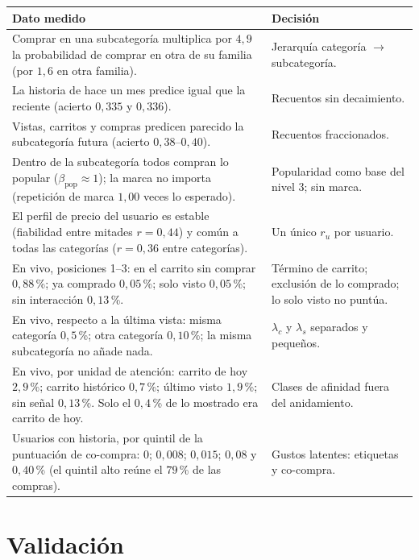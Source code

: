 \documentclass[11pt,a4paper]{article}
\begin{document}
\begin{center}
\begin{tabular}{p{7.4cm}p{7.4cm}}
\toprule
Dato medido & Decisión\\
\midrule
Comprar en una subcategoría multiplica por $4{,}9$ la probabilidad de comprar en otra de su familia
(por $1{,}6$ en otra familia). & Jerarquía categoría $\to$ subcategoría.\\
La historia de hace un mes predice igual que la reciente (acierto $0{,}335$ y $0{,}336$). & Recuentos sin
decaimiento.\\
Vistas, carritos y compras predicen parecido la subcategoría futura (acierto $0{,}38$--$0{,}40$). & Recuentos
fraccionados.\\
Dentro de la subcategoría todos compran lo popular ($\beta_{\text{pop}}\approx 1$); la marca no importa
(repetición de marca $1{,}00$ veces lo esperado). & Popularidad como base del nivel 3; sin marca.\\
El perfil de precio del usuario es estable (fiabilidad entre mitades $r=0{,}44$) y común a todas las
categorías ($r=0{,}36$ entre categorías). & Un único $r_u$ por usuario.\\
En vivo, posiciones 1--3: en el carrito sin comprar $0{,}88$\,\%; ya comprado $0{,}05$\,\%; solo visto
$0{,}05$\,\%; sin interacción $0{,}13$\,\%. & Término de carrito; exclusión de lo comprado; lo solo visto no
puntúa.\\
En vivo, respecto a la última vista: misma categoría $0{,}5$\,\%; otra categoría $0{,}10$\,\%; la misma
subcategoría no añade nada. & $\lambda_c$ y $\lambda_s$ separados y pequeños.\\
En vivo, por unidad de atención: carrito de hoy $2{,}9$\,\%; carrito histórico $0{,}7$\,\%; último visto
$1{,}9$\,\%; sin señal $0{,}13$\,\%. Solo el $0{,}4$\,\% de lo mostrado era carrito de hoy. & Clases de
afinidad fuera del anidamiento.\\
Usuarios con historia, por quintil de la puntuación de co-compra: $0$; $0{,}008$; $0{,}015$; $0{,}08$ y
$0{,}40$\,\% (el quintil alto reúne el $79$\,\% de las compras). & Gustos latentes: etiquetas y co-compra.\\
\bottomrule
\end{tabular}
\end{center}

\section{Validación}
\end{document}
